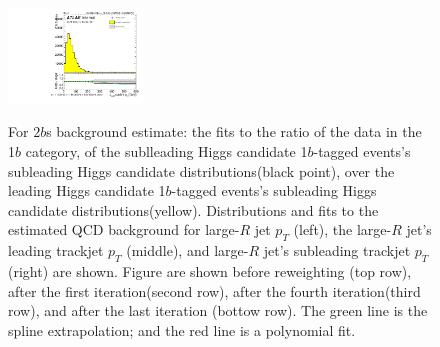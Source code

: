 \begin{figure}[htbp!]
\begin{center}
\includegraphics[angle=270, width=0.32\textwidth]{./figures/boosted/Reweight/Fits/Moriond_bkg_9_NoTag_2Trk_split_lead_Incl_sublHCand_trk1_Pt.pdf} \\
\caption{For $2b$s background estimate: the fits to the ratio of the data in the 1$b$ category, of the sublleading Higgs candidate 1$b$-tagged events's subleading Higgs candidate distributions(black point), over the leading Higgs candidate 1$b$-tagged events's subleading Higgs candidate distributions(yellow). Distributions and fits to the estimated QCD background for large-$R$ jet $p_{T}$ (left),  the large-$R$ jet's leading trackjet $p_T$ (middle), and large-$R$ jet's subleading trackjet $p_T$ (right) are shown.  Figure are shown before reweighting (top row), after the first iteration(second row), after the fourth iteration(third row), and after the last iteration (bottow row). The green line is the spline extrapolation; and the red line is a polynomial fit.}
\label{fig:rw-2bs-lead}
\end{center}
\end{figure}

